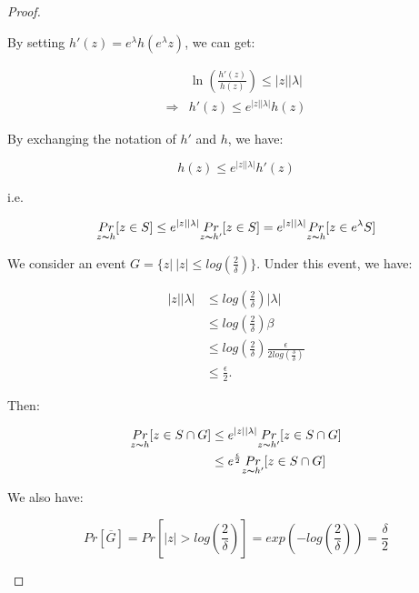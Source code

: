 \documentclass{article}
\begin{document}
\begin{proof}
\begin{itemize}
	By setting $h'(z) = e^{\lambda} h(e^{\lambda} z)$, we can get:

	\begin{equation*}
	\begin{split}
	&\ln(\frac{h'(z)}{h(z)}) \leq |z||\lambda|\\
	\Rightarrow & h'(z)\leq  e^{|z||\lambda|}h(z)
	\end{split}
	\end{equation*}

	By exchanging the notation of $h'$ and $h$, we have:

	\begin{equation*}
	h(z) \leq e^{|z||\lambda|}h'(z)
	\end{equation*}

	i.e.

	\begin{equation*}
	\underset{z \thicksim h}{Pr}[z \in S] 
	\leq  e^{|z||\lambda|}\underset{z \thicksim h'}{Pr}[z \in S]
	= e^{|z||\lambda|}\underset{z \thicksim h}{Pr}[z \in e^{\lambda} S]
	\end{equation*}

	We consider an event $G = \{z |\ |z|\leq log(\frac{2}{\delta}) \}$. Under this event, we have:

	\begin{equation*}
	\begin{split}
	|z||\lambda| 	& \leq log(\frac{2}{\delta})|\lambda|\\
					& \leq log(\frac{2}{\delta}) \beta\\
					&\leq log(\frac{2}{\delta})\frac{\epsilon}{2 log(\frac{3}{\delta})} \\
					&\leq \frac{\epsilon}{2}.
	\end{split}
	\end{equation*}

	Then:

	\begin{equation*}
	\begin{split}
	\underset{z \thicksim h}{Pr}[z \in S \cap G] 
	& \leq  e^{|z||\lambda|}\underset{z \thicksim h'}{Pr}[z \in S\cap G]\\
	& \leq e^{\frac{\epsilon}{2}} \underset{z \thicksim h'}{Pr}[z \in S \cap G]\\
	\end{split}
	\end{equation*}	


	We also have:

	\begin{equation*}
	Pr[\overline{G}] = Pr[|z| > log(\frac{2}{\delta})] = exp(-log(\frac{2}{\delta})) = \frac{\delta}{2}
	\end{equation*}


\end{itemize}
\end{proof}
\end{document}
